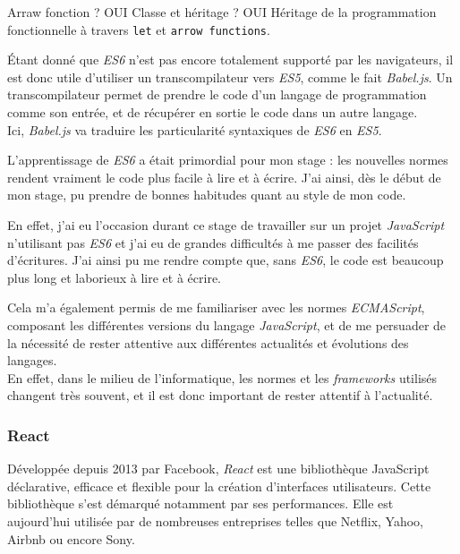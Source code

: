 Arraw fonction ? OUI Classe et héritage ? OUI Héritage de la
programmation fonctionnelle à travers \texttt{let} et
\texttt{arrow\ functions}.

\bigskip

Étant donné que \emph{ES6} n'est pas encore totalement supporté par les
navigateurs, il est donc utile d'utiliser un transcompilateur vers
\emph{ES5}, comme le fait \emph{Babel.js}. Un transcompilateur permet de
prendre le code d'un langage de programmation comme son entrée, et de
récupérer en sortie le code dans un autre langage.\\
Ici, \emph{Babel.js} va traduire les particularité syntaxiques de
\emph{ES6} en \emph{ES5}.

\bigskip

L'apprentissage de \emph{ES6} a était primordial pour mon stage : les
nouvelles normes rendent vraiment le code plus facile à lire et à
écrire. J'ai ainsi, dès le début de mon stage, pu prendre de bonnes
habitudes quant au style de mon code.

\bigskip

En effet, j'ai eu l'occasion durant ce stage de travailler sur un projet
\emph{JavaScript} n'utilisant pas \emph{ES6} et j'ai eu de grandes
difficultés à me passer des facilités d'écritures. J'ai ainsi pu me
rendre compte que, sans \emph{ES6}, le code est beaucoup plus long et
laborieux à lire et à écrire.

\bigskip

Cela m'a également permis de me familiariser avec les normes
\emph{ECMAScript}, composant les différentes versions du langage
\emph{JavaScript}, et de me persuader de la nécessité de rester
attentive aux différentes actualités et évolutions des langages.\\
En effet, dans le milieu de l'informatique, les normes et les
\emph{frameworks} utilisés changent très souvent, et il est donc
important de rester attentif à l'actualité.

\bigskip

\subsubsection{React}\label{react}

\bigskip

Développée depuis 2013 par Facebook, \emph{React} est une bibliothèque
JavaScript déclarative, efficace et flexible pour la création
d'interfaces utilisateurs. Cette bibliothèque s'est démarqué notamment
par ses performances. Elle est aujourd'hui utilisée par de nombreuses
entreprises telles que Netflix, Yahoo, Airbnb ou encore Sony.

